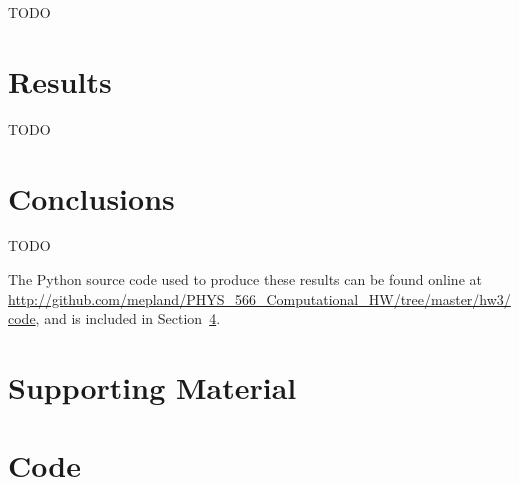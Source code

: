 \documentclass[notitlepage,aps,prd,nofootinbib]{revtex4-1}
\begin{document}
TODO


\section{Results}
\label{sec:results}
TODO

\begin{comment}
\begin{figure}[!htbc]
  \centering
  \texttt{[image: output/plot.pdf]}
	{\par\nobreak\rule[9pt]{35em}{0.5pt}\vspace{-5mm}}
	\caption{$R\left(t\right)$ calculated numerically with three different time steps, $\Delta t$, and the exact solution.}
	\label{fig:plot}
\end{figure}

\end{comment}


\section{Conclusions}
\label{sec:Conclusions}
TODO

The Python source code used to produce these results can be found online at \url{http://github.com/mepland/PHYS_566_Computational_HW/tree/master/hw3/code}, and is included in Section~\ref{sec:code}.

\clearpage
\section{Supporting Material}
\label{sec:Supporting_Material}

\clearpage


\clearpage
\section{Code}
\label{sec:code}


\end{document}
